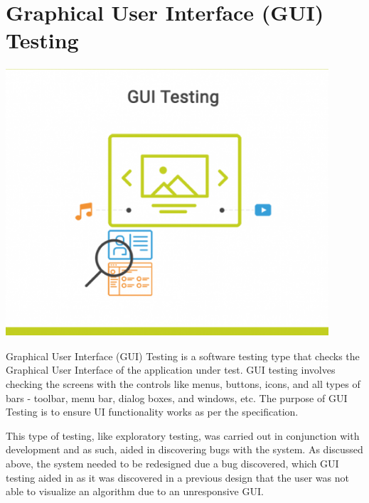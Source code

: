 \section{Graphical User Interface (GUI) Testing}
\begin{center}
    \includegraphics[width=12cm,height=10cm,keepaspectratio]{images/gui_testing}
\end{center}
Graphical User Interface (GUI) Testing is a software testing type that checks
the Graphical User Interface of the application under test. GUI testing involves
checking the screens with the controls like menus, buttons, icons, and all types
of bars - toolbar, menu bar, dialog boxes, and windows, etc. The purpose of GUI 
Testing is to ensure UI functionality works as per the specification. 
\par
\bigskip
This type of testing, like exploratory testing, was carried out in conjunction with development and as such, aided in discovering bugs with the system. As discussed above, the system needed to be redesigned due a bug discovered, which GUI testing aided in as it was discovered in a previous design that the user was not able to visualize an algorithm due to an unresponsive GUI.

